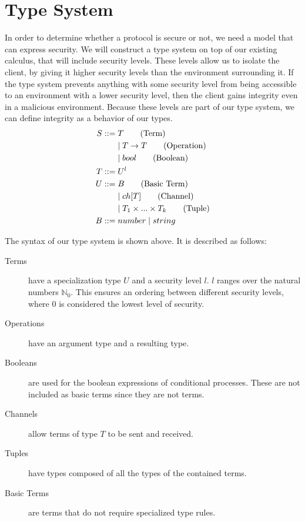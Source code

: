 \section{Type System}\label{ch:type-security}
In order to determine whether a protocol is secure or not, we need a model that can express security.
We will construct a type system on top of our existing calculus, that will include security levels.
These levels allow us to isolate the client, by giving it higher security levels than the environment surrounding it.
If the type system prevents anything with some security level from being accessible to an environment with a lower security level, then the client gains integrity even in a malicious environment.
Because these levels are part of our type system, we can define integrity as a behavior of our types.
\begin{align*}
	S::=&\;T \tag{Term}\\
	&\mid T\rightarrow T \tag{Operation}\\
	&\mid bool \tag{Boolean}\\
	T::=&\;U^l\\
	U::=&\;B \tag{Basic Term}\\
	&\mid ch[T] \tag{Channel}\\
	&\mid T_1 \times...\times T_k \tag{Tuple}\\
	B::=&\;number 
	\mid string\\
\end{align*}

\noindent The syntax of our type system is shown above. It is described as follows:

\begin{description}
\item[Terms] have a specialization type $U$ and a security level $l$.
$l$ ranges over the natural numbers $\mathbb{N}_0$.
This ensures an ordering between different security levels, where $0$ is considered the lowest level of security.
\item[Operations] have an argument type and a resulting type.
\item[Booleans] are used for the boolean expressions of conditional processes.
These are not included as basic terms since they are not terms.
\item[Channels] allow terms of type $T$ to be sent and received.
\item[Tuples] have types composed of all the types of the contained terms.
\item[Basic Terms] are terms that do not require specialized type rules.
\end{description}

